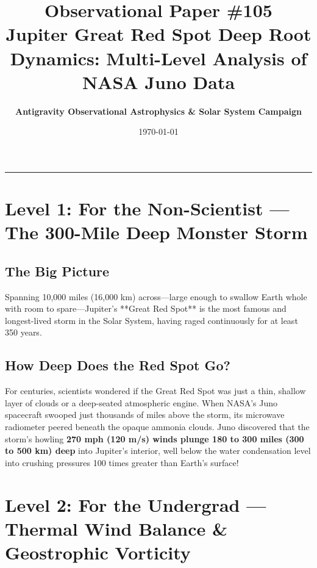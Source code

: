 \documentclass[11pt,a4paper]{article}
\title{\Huge \textbf{Observational Paper \#105}\\ \Large Jupiter Great Red Spot Deep Root Dynamics: Multi-Level Analysis of NASA Juno Data}
\author{\textbf{Antigravity Observational Astrophysics \& Solar System Campaign}}
\date{\today}
\begin{document}
\maketitle

\vspace{-1em}
\begin{center}
\rule{\textwidth}{1.5pt}
\end{center}

\section*{Level 1: For the Non-Scientist — The 300-Mile Deep Monster Storm}

\subsection*{The Big Picture}
Spanning 10,000 miles (16,000 km) across—large enough to swallow Earth whole with room to spare—Jupiter's **Great Red Spot** is the most famous and longest-lived storm in the Solar System, having raged continuously for at least 350 years.

\subsection*{How Deep Does the Red Spot Go?}
For centuries, scientists wondered if the Great Red Spot was just a thin, shallow layer of clouds or a deep-seated atmospheric engine. When NASA's Juno spacecraft swooped just thousands of miles above the storm, its microwave radiometer peered beneath the opaque ammonia clouds. Juno discovered that the storm's howling \textbf{270 mph (120 m/s) winds plunge 180 to 300 miles (300 to 500 km) deep} into Jupiter's interior, well below the water condensation level into crushing pressures 100 times greater than Earth's surface!

\newpage

\section*{Level 2: For the Undergrad — Thermal Wind Balance \& Geostrophic Vorticity}
\end{document}
